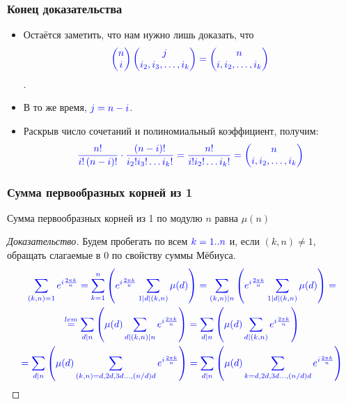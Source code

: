\begin{frame}[t]
    \frametitle{Конец доказательства}
    \begin{itemize}
        \item Остаётся заметить, что нам нужно лишь доказать, что $$\color{blue} \begin{pmatrix} n \\ i \end{pmatrix} \begin{pmatrix} j \\ i_2, i_3, \dots , i_k \end{pmatrix} = \begin{pmatrix} n \\ i, i_2, \dots, i_k \end{pmatrix}$$.
        \item В то же время, $\color{blue} j = n-i$.
        \item Раскрыв число сочетаний и полиномиальный коэффициент, получим: \[
                \color{blue} \frac{n!}{i! \left( n-i \right)!} \cdot \frac{\left( n-i \right) !}{i_2! i_3! \dots i_k!} = \frac{n!}{i!i_2! \dots i_k!} = \begin{pmatrix} n \\ i, i_2, \dots, i_k \end{pmatrix} 
        \] 
    \end{itemize}
    \hfill \qedsymbol
\end{frame}

\begin{frame}[t]
    \small
    \frametitle{Сумма первообразных корней из 1}
    
    \begin{theorem}[]
        Сумма первообразных корней из 1 по модулю $n$ равна  $\mu(n)$
    \end{theorem}
    \begin{proof}[Доказательство]
        \renewcommand{\qedsymbol}{}
        Будем пробегать по всем $\color{blue} k=1..n$ и, если $(k,n) \neq 1$, обращать слагаемые в 0 по свойству суммы Мёбиуса.
        \begin{gather*}
            \color{blue} \sum_{(k, n) = 1} e^{i \frac{2\pi k}{n}} = \sum_{k=1}^{n} \left( e^{i \frac{2\pi k}{n}} \sum_{1 \mid d \mid \left( k,n \right) } \mu(d) \right) = \sum_{(k, n) \mid n} \left( e^{i \frac{2\pi k}{n}} \sum_{1 \mid d \mid \left( k,n \right) } \mu(d) \right) = \\
            \color{blue} \overset{lem} = \sum_{d \mid n} \left( \mu(d) \sum_{d \mid \left( k,n \right) \mid n} e^{i \frac{2\pi k}{n}} \right) = \sum_{d \mid n} \left( \mu(d) \sum_{d \mid \left( k,n \right)} e^{i \frac{2\pi k}{n}} \right) \\ \color{blue} = \sum_{d \mid n} \left( \mu(d) \sum_{\left( k,n \right)=d,2d,3d \dots , \left( n / d\right) d  } e^{i \frac{2\pi k}{n}} \right)= \sum_{d \mid n} \left( \mu(d) \sum_{k=d,2d,3d \dots , \left( n / d\right) d   } e^{i \frac{2\pi k}{n}} \right)
        \end{gather*}
    \end{proof}
\end{frame}

